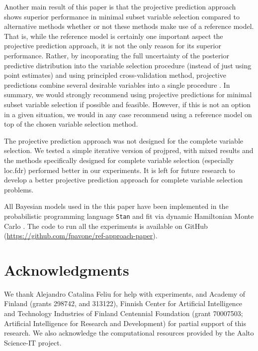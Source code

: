 \documentclass[a4]{article}
\theoremstyle{definition}
\begin{document}
Another main result of this paper is that the projective prediction
approach shows superior performance in minimal subset variable
selection compared to alternative methods whether or not these methods
make use of a reference model. That is, while the reference model is
certainly one important aspect the projective prediction approach, it
is not the only reason for its superior performance.  Rather, by
incoporating the full uncertainty of the posterior predictive
distribution into the variable selection procedure (instead of just
using point estimates) and using principled cross-validation method,
projective predictions combine several desirable variables into a
single procedure \citep{paper:projpred}.  In summary, we would
strongly recommend using projective predictions for minimal subset
 variable selection if possible and feasible. 
 However, if this is not an option in a given
situation, we would in any case recommend using a reference model on
top of the chosen variable selection method.

The projective prediction approach was not designed for the complete
variable selection. We tested a simple iterative version of projpred,
with mixed results and the methods specifically designed for complete
variable selection (especially loc.fdr) performed better in our
experiments. It is left for future research to develop 
a better projective prediction approach for complete variable
selection problems.

All Bayesian models used in the this paper have been implemented in
the probabilistic programming language \texttt{Stan}
\citep{paper:stan} and fit via dynamic Hamiltonian Monte Carlo
\citep{hoffman2014no,betancourt2017conceptual}. The code to run all
the experiments is available on GitHub
(\url{https://github.com/fpavone/ref-approach-paper}).

\section*{Acknowledgments}

We thank Alejandro Catalina Feliu for help with experiments, and
Academy of Finland (grants 298742, and 313122), Finnish Center for
Artificial Intelligence and Technology Industries of Finland
Centennial Foundation (grant 70007503; Artificial Intelligence for
Research and Development) for partial support of this research. We
also acknowledge the computational resources provided by the Aalto
Science-IT project.
 

\end{document}
